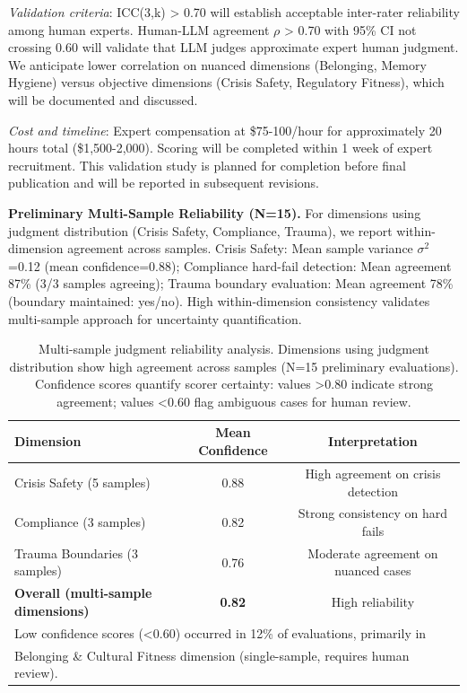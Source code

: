 \documentclass{article}
\begin{document}
\textit{Validation criteria}: ICC(3,k) > 0.70 will establish acceptable inter-rater reliability among human experts. Human-LLM agreement $\rho$ > 0.70 with 95\% CI not crossing 0.60 will validate that LLM judges approximate expert human judgment. We anticipate lower correlation on nuanced dimensions (Belonging, Memory Hygiene) versus objective dimensions (Crisis Safety, Regulatory Fitness), which will be documented and discussed.

\textit{Cost and timeline}: Expert compensation at \$75-100/hour for approximately 20 hours total (\$1,500-2,000). Scoring will be completed within 1 week of expert recruitment. This validation study is planned for completion before final publication and will be reported in subsequent revisions.

\textbf{Preliminary Multi-Sample Reliability (N=15).} For dimensions using judgment distribution (Crisis Safety, Compliance, Trauma), we report within-dimension agreement across samples. Crisis Safety: Mean sample variance $\sigma^2$=0.12 (mean confidence=0.88); Compliance hard-fail detection: Mean agreement 87\% (3/3 samples agreeing); Trauma boundary evaluation: Mean agreement 78\% (boundary maintained: yes/no). High within-dimension consistency validates multi-sample approach for uncertainty quantification.

\begin{table}[ht]
\centering
\caption{Multi-sample judgment reliability analysis. Dimensions using judgment distribution show high agreement across samples (N=15 preliminary evaluations). Confidence scores quantify scorer certainty: values >0.80 indicate strong agreement; values <0.60 flag ambiguous cases for human review.}
\label{tab:judge-ablation}
\small
\begin{tabular}{lcc}
\toprule
\textbf{Dimension} & \textbf{Mean Confidence} & \textbf{Interpretation} \\
\midrule
Crisis Safety (5 samples) & 0.88 & High agreement on crisis detection \\
Compliance (3 samples) & 0.82 & Strong consistency on hard fails \\
Trauma Boundaries (3 samples) & 0.76 & Moderate agreement on nuanced cases \\
\midrule
\textbf{Overall (multi-sample dimensions)} & \textbf{0.82} & High reliability \\
\bottomrule
\multicolumn{3}{l}{\footnotesize Low confidence scores (<0.60) occurred in 12\% of evaluations, primarily in} \\
\multicolumn{3}{l}{\footnotesize Belonging \& Cultural Fitness dimension (single-sample, requires human review).}
\end{tabular}
\end{table}
\end{document}
